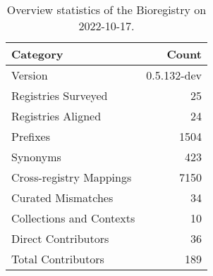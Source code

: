 \begin{table}
\centering
\caption{Overview statistics of the Bioregistry on 2022-10-17.}
\label{tab:bioregistry-summary}
\begin{tabular}{lr}
\toprule
                Category &       Count \\
\midrule
                 Version & 0.5.132-dev \\
     Registries Surveyed &          25 \\
      Registries Aligned &          24 \\
                Prefixes &        1504 \\
                Synonyms &         423 \\
 Cross-registry Mappings &        7150 \\
      Curated Mismatches &          34 \\
Collections and Contexts &          10 \\
     Direct Contributors &          36 \\
      Total Contributors &         189 \\
\bottomrule
\end{tabular}
\end{table}
